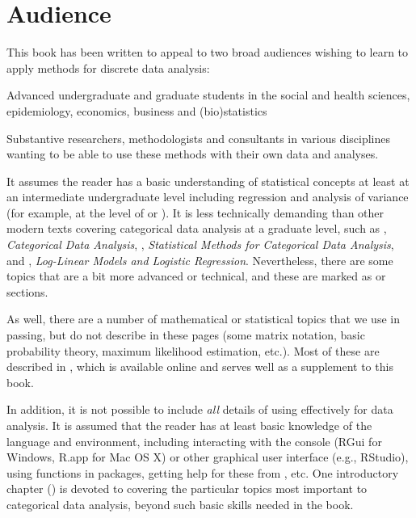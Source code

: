\section*{Audience}
This book has been written to appeal to two broad audiences wishing to learn to apply methods for
discrete data analysis:
 \begin{itemize*}
   \item Advanced undergraduate and graduate students in the social and health sciences, epidemiology,
     economics, business and (bio)statistics
 	\item Substantive researchers, methodologists and consultants in various disciplines wanting to be able to use
 	 these methods with their own data and analyses.
 \end{itemize*}

It assumes the reader has a basic understanding of statistical concepts at least at an
intermediate undergraduate level including regression and analysis of variance
(for example, at the level of \citet{Neter-etal:90} or \citet{MendenhallSincich:2003}).
It is less technically demanding than other modern texts covering
categorical data analysis at a graduate level, such as
 \citet{Agresti:2013}, \emph{Categorical Data Analysis},
 \citet{PowersXie:2008}, \emph{Statistical Methods for Categorical Data Analysis}, and
 \citet{Christensen:97}, \emph{Log-Linear Models and Logistic Regression}.
Nevertheless, there are some topics that are a bit more advanced or technical, and
these are marked as \hard or \veryhard sections.

As well, there are a number of mathematical or 
statistical topics that we use in passing, but do not describe
in these pages (some matrix notation, basic probability theory, maximum likelihood estimation, etc.).
Most of these are described in \citet{Fox:2015}, which is available online and serves well as
a supplement to this book.


In addition, it is not possible to include \emph{all} details of using \R effectively for
data analysis. It is assumed that the reader has at least basic knowledge of the \R language and
environment, including interacting with the \R console (RGui for Windows, R.app for Mac OS X)
or other graphical user interface (e.g., RStudio), using \R functions in packages,
getting help for these from \R, etc.  One introductory chapter () is devoted
to covering the particular topics most important to categorical data analysis,
beyond such basic skills needed in the book.

